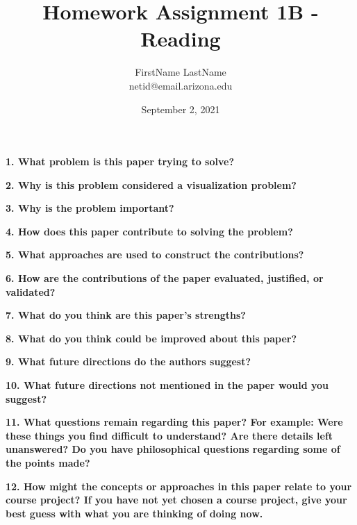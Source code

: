 \documentclass{article}[12pt]
\begin{document}
\title{Homework Assignment 1B - Reading}
\date{September 2, 2021}

\author{
   FirstName LastName \\
   netid@email.arizona.edu
}

\maketitle

\noindent
{\bf 1. What problem is this paper trying to solve?}

\vspace{2ex}\noindent
{\bf 2. Why is this problem considered a visualization problem?}

\vspace{2ex}\noindent
{\bf 3. Why is the problem important?}

\vspace{2ex}\noindent
{\bf 4. How does this paper contribute to solving the problem?} 

\vspace{2ex}\noindent
{\bf 5. What approaches are used to construct the contributions?}

\vspace{2ex}\noindent
{\bf 6. How are the contributions of the paper evaluated, justified, or
validated?} 

\vspace{2ex}\noindent
{\bf 7. What do you think are this paper's strengths?} 

\vspace{2ex}\noindent
{\bf 8. What do you think could be improved about this paper?}

\vspace{2ex}\noindent
{\bf 9. What future directions do the authors suggest?}

\vspace{2ex}\noindent
{\bf 10. What future directions not mentioned in the paper would you suggest?}

\vspace{2ex}\noindent
{\bf 11. What questions remain regarding this paper? For example: Were these things
   you find difficult to understand? Are there details left unanswered? Do you
have philosophical questions regarding some of the points made?}

\vspace{2ex}\noindent
{\bf 12. How might the concepts or approaches in this paper relate to your course
   project? If you have not yet chosen a course project, give your best guess
with what you are thinking of doing now.}
\end{document}

